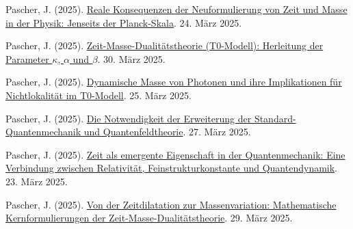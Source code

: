\documentclass[a4paper,12pt]{article}
\begin{document}
	\begin{thebibliography}{99}
		
		 Pascher, J. (2025). \href{https://github.com/jpascher/T0-Time-Mass-Duality/tree/main/2/pdf/Deutsch/JenseitsPlanck.pdf}{Reale Konsequenzen der Neuformulierung von Zeit und Masse in der Physik: Jenseits der Planck-Skala}. 24. März 2025.
		
		 Pascher, J. (2025). \href{https://github.com/jpascher/T0-Time-Mass-Duality/tree/main/2/pdf/Deutsch/ZeitMasseT0Params.pdf}{Zeit-Masse-Dualitätstheorie (T0-Modell): Herleitung der Parameter \(\kappa\), \(\alpha\) und \(\beta\)}. 30. März 2025.
		
		 Pascher, J. (2025). \href{https://github.com/jpascher/T0-Time-Mass-Duality/tree/main/2/pdf/Deutsch/DynMassePhotonenNichtlokal.pdf}{Dynamische Masse von Photonen und ihre Implikationen für Nichtlokalität im T0-Modell}. 25. März 2025.
		
		 Pascher, J. (2025). \href{https://github.com/jpascher/T0-Time-Mass-Duality/tree/main/2/pdf/Deutsch/NotwendigkeitQMErweiterung.pdf}{Die Notwendigkeit der Erweiterung der Standard-Quantenmechanik und Quantenfeldtheorie}. 27. März 2025.
		
		 Pascher, J. (2025). \href{https://github.com/jpascher/T0-Time-Mass-Duality/tree/main/2/pdf/Deutsch/ZeitEmergentQM.pdf}{Zeit als emergente Eigenschaft in der Quantenmechanik: Eine Verbindung zwischen Relativität, Feinstrukturkonstante und Quantendynamik}. 23. März 2025.
		
		 Pascher, J. (2025). \href{https://github.com/jpascher/T0-Time-Mass-Duality/tree/main/2/pdf/Deutsch/MathZeitMasseLagrange.pdf}{Von der Zeitdilatation zur Massenvariation: Mathematische Kernformulierungen der Zeit-Masse-Dualitätstheorie}. 29. März 2025.
		
	\end{thebibliography}
	
\end{document}
